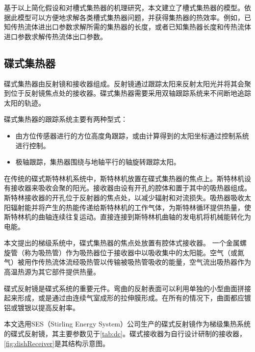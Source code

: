 基于以上简化假设和对槽式集热器的机理研究，本文建立了槽式集热器的模型。依据此模型可以方便地求解各类槽式集热器问题，并获得集热器的热效率。例如，已知传热流体进出口参数求解所需的集热器的长度，或者已知集热器长度和传热流体进口参数求解传热流体出口参数。

\subsection{碟式集热器}
\label{sec:pdc}

碟式集热器由反射镜和接收器组成。反射镜通过跟踪太阳来反射太阳光并将其会聚到位于反射镜焦点处的接收器。碟式集热器需要采用双轴跟踪系统来不间断地追踪太阳的轨迹。

碟式集热器的跟踪系统主要有两种型式\cite{Adkins1987}：
\begin{itemize}
  \item 由方位传感器进行的方位高度角跟踪，或由计算得到的太阳坐标通过控制系统进行控制。
  \item 极轴跟踪，集热器围绕与地轴平行的轴旋转跟踪太阳。
\end{itemize}

在传统的碟式斯特林机系统中，斯特林机放置在碟式集热器的焦点上。斯特林机设有接收器来吸收会聚的阳光。接收器由设有开孔的腔体和置于其中的吸热器组成。斯特林接收器的开孔位于反射器的焦点处，以减少辐射和对流损失。吸热器吸收太阳辐射能并将产生的热能传递给斯特林机的工作气体，为斯特林循环提供热量，使斯特林机的曲轴连续往复运动。直接连接到斯特林机曲轴的发电机将机械能转化为电能。

本文提出的梯级系统中，碟式集热器的焦点处放置有腔体式接收器。 一个金属螺旋管（称为吸热管）作为吸热器位于接收器中以吸收集中的太阳能。空气（或氮气）被用作传热流体流经吸热管以传输被吸热管吸收的能量，空气流出吸热器作为高温热源为其它部件提供热量。

碟式反射镜是碟式系统的重要元件。弯曲的反射表面可以利用单独的小型曲面拼接起来形成，或是通过由连续气室成形的拉伸膜形成。在所有的情况下，曲面都应镀铝或镀银以提高反射率。

本文选用SES（Stirling Energy System）公司生产的碟式反射镜作为梯级集热系统的碟式反射镜，其主要参数见于\autoref{tab:dc}。碟式接收器为自行设计研制的接收器，\autoref{fig:dishReceiver}是其结构示意图。

